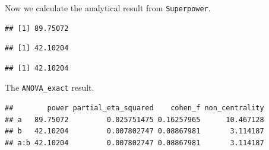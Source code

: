 \documentclass[
]{book}
\newenvironment{Shaded}{\begin{snugshade}}{\end{snugshade}}
\newcommand{\DataTypeTok}[1]{\textcolor[rgb]{0.13,0.29,0.53}{#1}}
\newcommand{\KeywordTok}[1]{\textcolor[rgb]{0.13,0.29,0.53}{\textbf{#1}}}
\newcommand{\NormalTok}[1]{#1}
\newcommand{\OperatorTok}[1]{\textcolor[rgb]{0.81,0.36,0.00}{\textbf{#1}}}
\newcommand{\OtherTok}[1]{\textcolor[rgb]{0.56,0.35,0.01}{#1}}
\newcommand{\StringTok}[1]{\textcolor[rgb]{0.31,0.60,0.02}{#1}}
\begin{document}
Now we calculate the analytical result from \texttt{Superpower}.

\begin{Shaded}
\end{Shaded}

\begin{verbatim}
## [1] 89.75072
\end{verbatim}

\begin{Shaded}
\end{Shaded}

\begin{verbatim}
## [1] 42.10204
\end{verbatim}

\begin{Shaded}
\end{Shaded}

\begin{verbatim}
## [1] 42.10204
\end{verbatim}

The \texttt{ANOVA\_exact} result.

\begin{Shaded}
\end{Shaded}

\begin{verbatim}
##        power partial_eta_squared    cohen_f non_centrality
## a   89.75072         0.025751475 0.16257965      10.467128
## b   42.10204         0.007802747 0.08867981       3.114187
## a:b 42.10204         0.007802747 0.08867981       3.114187
\end{verbatim}
\end{document}
